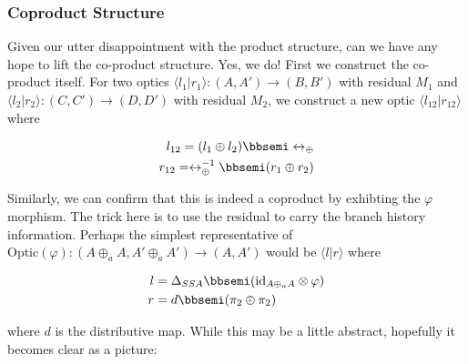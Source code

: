 \documentclass[letterpaper, 10 pt, conference]{ieeeconf}  %
\begin{document}
\subsubsection{Coproduct Structure}

Given our utter disappointment with the product structure, can we have any
hope to lift the co-product structure. Yes, we do! First we construct the
co-product itself. For two optics $\langle l_1 | r_1 \rangle: (A, A') \to (B, B')$
with residual $M_1$ and $\langle l_2 | r_2 \rangle: (C, C') \to (D, D')$ with residual $M_2$,
we construct a new optic $\langle l_{12} | r_{12} \rangle$ where

\begin{equation}
\begin{split}
l_{12} = (l_1 \oplus l_2) \bbsemi \leftrightarrow_{\oplus} \\
r_{12} = \leftrightarrow_{\oplus}^{-1} \bbsemi (r_1 \oplus r_2)
\end{split}
\end{equation}

Similarly, we can confirm that this is indeed a coproduct by exhibting the $\varphi$
morphism. The trick here is to use the
residual to carry the branch history information. Perhaps the simplest
representative of $\text{Optic}(\varphi): (A \oplus_a A, A' \oplus_a A') \to (A, A')$ would be $\langle l | r \rangle$ where

\begin{equation}
\begin{split}
l &= \Delta_{SSA} \bbsemi (\text{id}_{A \oplus_a A} \otimes \varphi) \\
r &= d \bbsemi (\pi_2 \oplus \pi_2)
\end{split}
\end{equation}

where $d$ is the distributive map. While this may be a little abstract, hopefully
it becomes clear as a picture:
\end{document}
